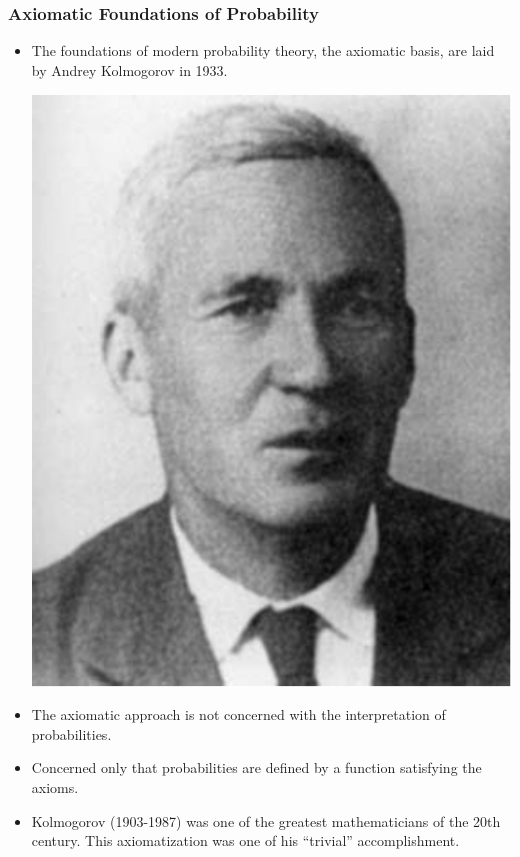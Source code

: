\documentclass[slidestop,compress,mathserif]{beamer}
\begin{document}
\begin{frame}\frametitle{Axiomatic Foundations of Probability}
\begin{itemize}
\item The foundations of modern probability theory, the axiomatic basis, are laid by Andrey Kolmogorov in 1933.
\begin{center}
\includegraphics[scale=0.25]{figures/Kolmogorov_7.pdf}
\end{center}

\pause
\item The axiomatic approach is not concerned with the interpretation of probabilities.
\item Concerned only that probabilities are defined by a function satisfying the axioms.
\pause
\item Kolmogorov (1903-1987) was one of the greatest
mathematicians of the 20th century. This axiomatization was one of his ``trivial'' accomplishment.
\end{itemize}
\end{frame}
\end{document}

